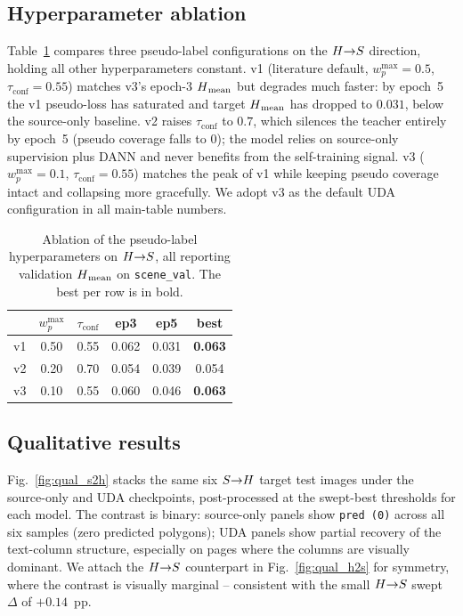 \subsection{Hyperparameter ablation}
\label{sec:exp:ablation}
Table~\ref{tab:ablation} compares three pseudo-label
configurations on the $H{\rightarrow}S$ direction, holding all other
hyperparameters constant. v1 (literature default,
$w_p^{\max}=0.5$, $\tau_{\mathrm{conf}}=0.55$) matches v3's epoch-3
$H\textsubscript{mean}$ but degrades much faster: by epoch~5 the
v1 pseudo-loss has saturated and target $H\textsubscript{mean}$ has dropped to
$0.031$, below the source-only baseline. v2 raises
$\tau_{\mathrm{conf}}$ to $0.7$, which silences the teacher entirely
by epoch~5 (pseudo coverage falls to $0$); the model relies on
source-only supervision plus DANN and never benefits from the
self-training signal. v3 ($w_p^{\max}=0.1$, $\tau_{\mathrm{conf}}=0.55$)
matches the peak of v1 while keeping pseudo coverage intact and
collapsing more gracefully. We adopt v3 as the default UDA
configuration in all main-table numbers.

\begin{table}[t]
\centering
\caption{Ablation of the pseudo-label hyperparameters on
$H{\rightarrow}S$, all reporting validation $H\textsubscript{mean}$ on
\texttt{scene\_val}. The best per row is in bold.}
\label{tab:ablation}
\begin{tabular}{lccccc}
\toprule
& $w_p^{\max}$ & $\tau_{\mathrm{conf}}$ & ep3 & ep5 & best \\
\midrule
v1 & 0.50 & 0.55 & 0.062 & 0.031 & \textbf{0.063} \\
v2 & 0.20 & 0.70 & 0.054 & 0.039 & 0.054 \\
v3 & 0.10 & 0.55 & 0.060 & 0.046 & \textbf{0.063} \\
\bottomrule
\end{tabular}
\end{table}

\subsection{Qualitative results}
\label{sec:exp:qual}
Fig.~\ref{fig:qual_s2h} stacks the same six $S{\rightarrow}H$ target test
images under the source-only and UDA checkpoints, post-processed at
the swept-best thresholds for each model. The contrast is binary:
source-only panels show \texttt{pred (0)} across all six samples
(zero predicted polygons); UDA panels show partial recovery of the
text-column structure, especially on pages where the columns are
visually dominant. We attach the $H{\rightarrow}S$ counterpart in
Fig.~\ref{fig:qual_h2s} for symmetry, where the contrast is
visually marginal -- consistent with the small $H{\rightarrow}S$ swept
$\Delta$ of $+0.14$~pp.

